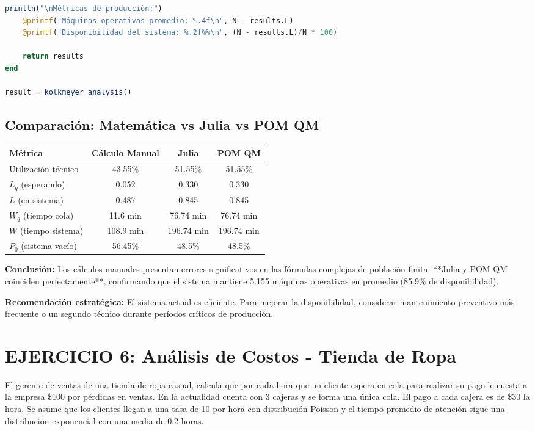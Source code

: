 \documentclass[12pt, a4paper, oneside]{book}
\theoremstyle{definition}
\begin{document}
\begin{center}
\begin{center}
\begin{lstlisting}[language=Julia]
    println("\nMétricas de producción:")
    @printf("Máquinas operativas promedio: %.4f\n", N - results.L)
    @printf("Disponibilidad del sistema: %.2f%%\n", (N - results.L)/N * 100)
    
    return results
end

result = kolkmeyer_analysis()
\end{lstlisting}

\subsection{Comparación: Matemática vs Julia vs POM QM}

\begin{center}
\begin{tabular}{|l|c|c|c|}
\hline
\textbf{Métrica} & \textbf{Cálculo Manual} & \textbf{Julia} & \textbf{POM QM} \\
\hline
Utilización técnico & 43.55\% & 51.55\% & 51.55\% \\
$L_q$ (esperando) & 0.052 & 0.330 & 0.330 \\
$L$ (en sistema) & 0.487 & 0.845 & 0.845 \\
$W_q$ (tiempo cola) & 11.6 min & 76.74 min & 76.74 min \\
$W$ (tiempo sistema) & 108.9 min & 196.74 min & 196.74 min \\
$P_0$ (sistema vacío) & 56.45\% & 48.5\% & 48.5\% \\
\hline
\end{tabular}
\end{center}

\textbf{Conclusión:} Los cálculos manuales presentan errores significativos en las fórmulas complejas de población finita. **Julia y POM QM coinciden perfectamente**, confirmando que el sistema mantiene 5.155 máquinas operativas en promedio (85.9\% de disponibilidad).

\textbf{Recomendación estratégica:} El sistema actual es eficiente. Para mejorar la disponibilidad, considerar mantenimiento preventivo más frecuente o un segundo técnico durante períodos críticos de producción.

\section{EJERCICIO 6: Análisis de Costos - Tienda de Ropa}

El gerente de ventas de una tienda de ropa casual, calcula que por cada hora que un cliente espera en cola para realizar su pago le cuesta a la empresa \$100 por pérdidas en ventas. En la actualidad cuenta con 3 cajeras y se forma una única cola. El pago a cada cajera es de \$30 la hora. Se asume que los clientes llegan a una tasa de 10 por hora con distribución Poisson y el tiempo promedio de atención sigue una distribución exponencial con una media de 0.2 horas.


\end{center}
\end{center}
\end{document}
